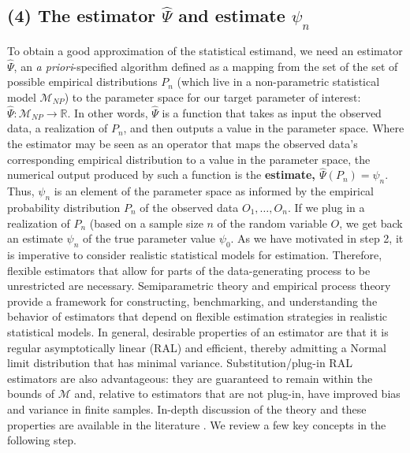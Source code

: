 \documentclass[
  12pt, krantz2,
]{krantz}
\newcommand{\R}{\mathbb{R}}
\newcommand{\M}{\mathcal{M}}
\newcommand{\1}{\mathbbm{1}}
\theoremstyle{definition}
\theoremstyle{definition}
\theoremstyle{definition}
\theoremstyle{definition}
\theoremstyle{remark}
\begin{document}
\hypertarget{the-estimator-hatpsi-and-estimate-psi_n}{%
\subsection*{\texorpdfstring{(4) The estimator \(\hat{\Psi}\) and estimate \(\psi_n\)}{(4) The estimator \textbackslash hat\{\textbackslash Psi\} and estimate \textbackslash psi\_n}}\label{the-estimator-hatpsi-and-estimate-psi_n}}


To obtain a good approximation of the statistical estimand, we need an estimator
\(\hat{\Psi}\), an \emph{a priori}-specified algorithm defined as a mapping from the set
of the set of possible empirical distributions \(P_n\) (which live in a
non-parametric statistical model \(\M_{NP}\)) to the parameter space for our
target parameter of interest: \(\hat{\Psi} : \M_{NP} \rightarrow \R\). In other
words, \(\hat{\Psi}\) is a function that takes as input the observed data, a
realization of \(P_n\), and then outputs a value in the parameter space. Where the
estimator may be seen as an operator that maps the observed data's corresponding
empirical distribution to a value in the parameter space, the numerical output
produced by such a function is the \textbf{estimate, \(\hat{\Psi}(P_n)=\psi_n\)}. Thus,
\(\psi_n\) is an element of the parameter space as informed by the empirical
probability distribution \(P_n\) of the observed data \(O_1, \ldots, O_n\). If we
plug in a realization of \(P_n\) (based on a sample size \(n\) of the random
variable \(O\), we get back an estimate \(\psi_n\) of the true parameter value
\(\psi_0\).
As we have motivated in step 2, it is imperative to consider realistic
statistical models for estimation. Therefore, flexible estimators that allow for
parts of the data-generating process to be unrestricted are necessary.
Semiparametric theory and empirical process theory provide a framework for
constructing, benchmarking, and understanding the behavior of estimators that
depend on flexible estimation strategies in realistic statistical models. In
general, desirable properties of an estimator are that it is regular
asymptotically linear (RAL) and efficient, thereby admitting a Normal limit
distribution that has minimal variance. Substitution/plug-in RAL estimators are
also advantageous: they are guaranteed to remain within the bounds of \(\M\) and,
relative to estimators that are not plug-in, have improved bias and variance in
finite samples. In-depth discussion of the theory and these properties are
available in the literature \citep[e.g.,][]{kennedy2016semiparametric, vdl2011targeted}. We review a few key concepts in the following step.
\end{document}

